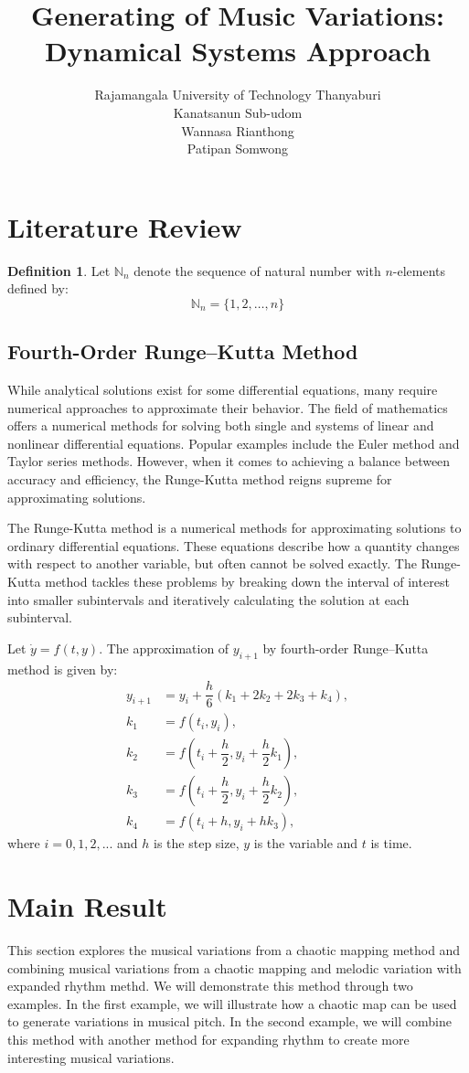 \documentclass[11pt]{article}
\title{Generating of Music Variations: Dynamical Systems Approach}
\author{Rajamangala University of Technology Thanyaburi\\Kanatsanun Sub-udom\\Wannasa Rianthong\\Patipan Somwong}
\theoremstyle{definition}
\newtheorem{definition}[theorem]{Definition}
\begin{document}
\section{Literature Review}

\begin{definition}
Let $\mathbb{N}_n$ denote the sequence of natural number with $n$-elements defined by:
\[ \mathbb{N}_n = \{ 1, 2, \dots, n \}  \]
\end{definition}

\subsection{Fourth-Order Runge–Kutta Method}
While analytical solutions exist for some differential equations, many require numerical approaches to approximate their behavior. The field of mathematics offers a numerical methods for solving both single and systems of linear and nonlinear differential equations. Popular examples include the Euler method and Taylor series methods. However, when it comes to achieving a balance between accuracy and efficiency, the Runge-Kutta method reigns supreme for approximating solutions.

The Runge-Kutta method \cite{bose_numerical_2019} is a numerical methods for approximating solutions to ordinary differential equations. These equations describe how a quantity changes with respect to another variable, but often cannot be solved exactly. The Runge-Kutta method tackles these problems by breaking down the interval of interest into smaller subintervals and iteratively calculating the solution at each subinterval. 

Let $\dot{y} = f(t,y)$. The approximation of $y_{i+1}$ by fourth-order Runge–Kutta method is given by:
\begin{align*}
y_{i+1} &= y_i + \dfrac{h}{6}(k_1 + 2k_2 + 2k_3 + k_4), \\
k_1 &= f(t_i, y_i), \\
k_2 &= f\left( t_i + \dfrac{h}{2}, y_i + \dfrac{h}{2}k_1 \right), \\
k_3 &= f\left( t_i + \dfrac{h}{2}, y_i + \dfrac{h}{2}k_2 \right), \\
k_4 &= f(t_i + h, y_i + hk_3),
\end{align*}
\label{fig:RK4}
where $i = 0,1,2,...$ and $h$ is the step size, $y$ is the variable and $t$ is time.

\section{Main Result}
This section explores the musical variations from a chaotic mapping method and combining musical variations from a chaotic mapping and melodic variation with expanded rhythm methd. We will demonstrate this method through two examples. In the first example, we will illustrate how a chaotic map can be used to generate variations in musical pitch. In the second example, we will combine this method with another method for expanding rhythm to create more interesting musical variations.
\end{document}
